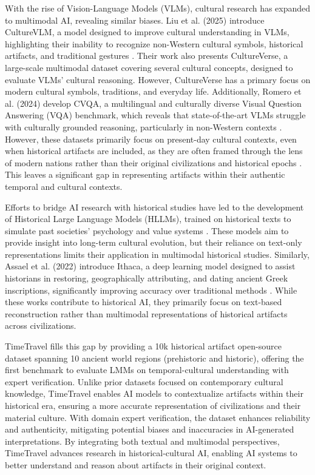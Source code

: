 With the rise of Vision-Language Models (VLMs), cultural research has expanded to multimodal AI, revealing similar biases. Liu et al. (2025) introduce CultureVLM, a model designed to improve cultural understanding in VLMs, highlighting their inability to recognize non-Western cultural symbols, historical artifacts, and traditional gestures \cite{liu2025culturevlm}. Their work also presents CultureVerse, a large-scale multimodal dataset covering several cultural concepts, designed to evaluate VLMs' cultural reasoning. However, CultureVerse has a primary focus on modern cultural symbols, traditions, and everyday life. Additionally, Romero et al. (2024) develop CVQA, a multilingual and culturally diverse Visual Question Answering (VQA) benchmark, which reveals that state-of-the-art VLMs struggle with culturally grounded reasoning, particularly in non-Western contexts \cite{romero2024cvqa}. However, these datasets primarily focus on present-day cultural contexts, even when historical artifacts are included, as they are often framed through the lens of modern nations rather than their original civilizations and historical epochs \cite{liu2025culturevlm}. This leaves a significant gap in representing artifacts within their authentic temporal and cultural contexts.

Efforts to bridge AI research with historical studies have led to the development of Historical Large Language Models (HLLMs), trained on historical texts to simulate past societies' psychology and value systems \cite{varnum2024large}. These models aim to provide insight into long-term cultural evolution, but their reliance on text-only representations limits their application in multimodal historical studies. Similarly, Assael et al. (2022) introduce Ithaca, a deep learning model designed to assist historians in restoring, geographically attributing, and dating ancient Greek inscriptions, significantly improving accuracy over traditional methods \cite{Assael2022RestoringAA}. While these works contribute to historical AI, they primarily focus on text-based reconstruction rather than multimodal representations of historical artifacts across civilizations.

TimeTravel fills this gap by providing a 10k historical artifact open-source dataset spanning 10 ancient world regions (prehistoric and historic), offering the first benchmark to evaluate LMMs on temporal-cultural understanding with expert verification. Unlike prior datasets focused on contemporary cultural knowledge, TimeTravel enables AI models to contextualize artifacts within their historical era, ensuring a more accurate representation of civilizations and their material culture. With domain expert verification, the dataset enhances reliability and authenticity, mitigating potential biases and inaccuracies in AI-generated interpretations. By integrating both textual and multimodal perspectives, TimeTravel advances research in historical-cultural AI, enabling AI systems to better understand and reason about artifacts in their original context.